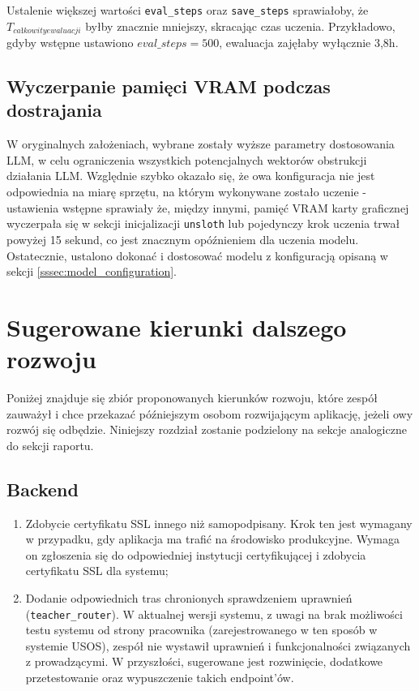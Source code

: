 \documentclass[12pt,a4paper]{article}
\begin{document}
Ustalenie większej wartości \texttt{eval\_steps} oraz \texttt{save\_steps} sprawiałoby, że $T_{całkowity ewaluacji}$ byłby znacznie mniejszy, skracając
czas uczenia. Przykładowo, gdyby wstępne ustawiono $eval\_steps = 500$, ewaluacja zajęłaby wyłącznie 3,8h.

\subsection{Wyczerpanie pamięci VRAM podczas dostrajania}

W oryginalnych założeniach, wybrane zostały wyższe parametry dostosowania LLM, w celu ograniczenia wszystkich potencjalnych wektorów obstrukcji działania LLM. 
Względnie szybko okazało się, że owa konfiguracja nie jest odpowiednia na miarę sprzętu, na którym wykonywane zostało uczenie - ustawienia wstępne sprawiały że, między innymi, 
pamięć VRAM karty graficznej wyczerpała się w sekcji inicjalizacji \texttt{unsloth} lub pojedynczy krok uczenia trwał powyżej 15 sekund, co jest znacznym opóźnieniem dla uczenia modelu.
Ostatecznie, ustalono dokonać i dostosować modelu z konfiguracją opisaną w sekcji \ref{sssec:model_configuration}.


\section{Sugerowane kierunki dalszego rozwoju}

Poniżej znajduje się zbiór proponowanych kierunków rozwoju, które zespół zauważył i chce przekazać późniejszym osobom rozwijającym aplikację, jeżeli owy rozwój się odbędzie.
Niniejszy rozdział zostanie podzielony na sekcje analogiczne do sekcji raportu.

\subsection{Backend}
\begin{enumerate}
    \item Zdobycie certyfikatu SSL innego niż samopodpisany. Krok ten jest wymagany w przypadku, gdy aplikacja ma trafić na środowisko produkcyjne. Wymaga on zgłoszenia się do odpowiedniej instytucji certyfikującej i zdobycia certyfikatu SSL dla systemu; 
    \item Dodanie odpowiednich tras chronionych sprawdzeniem uprawnień (\texttt{teacher\_router}). W aktualnej wersji systemu, z uwagi na brak możliwości testu systemu od strony pracownika (zarejestrowanego w ten sposób w systemie USOS), zespół nie wystawił uprawnień i funkcjonalności związanych z prowadzącymi. W przyszłości, sugerowane jest rozwinięcie, dodatkowe przetestowanie oraz wypuszczenie takich endpoint'ów.
\end{enumerate}
\end{document}
